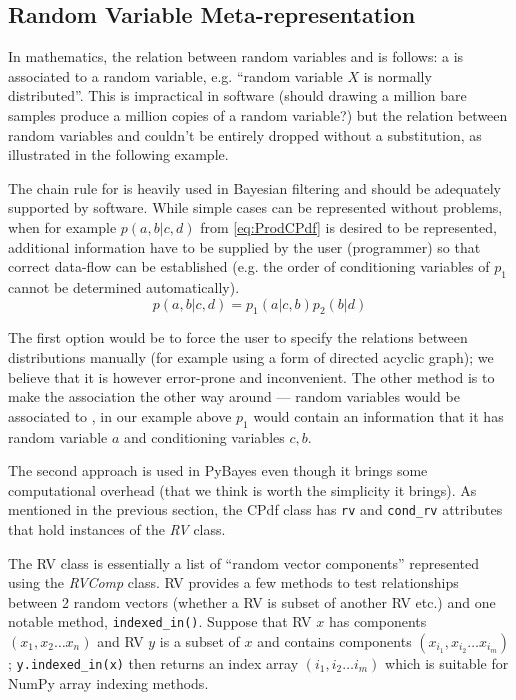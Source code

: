 \subsection{Random Variable Meta-representation}

In mathematics, the relation between random variables and {\pdfs} is follows: a {\pdf} is associated
to a random variable, e.g. ``random variable \(X\) is normally distributed''. This is impractical in
software (should drawing a million bare samples produce a million copies of a random variable?) but
the relation between random variables and {\pdfs} couldn't be entirely dropped without a substitution,
as illustrated in the following example.

The chain rule for {\pdfs} is heavily used in Bayesian filtering and should be adequately supported
by software. While simple cases can be represented without problems, when for example \(p(a,b|c,d)\)
from \eqref{eq:ProdCPdf} is desired to be represented, additional information have to be supplied by
the user (programmer) so that correct data-flow can be established (e.g. the order of conditioning
variables of \(p_1\) cannot be determined automatically).
\begin{equation} \label{eq:ProdCPdf}
	p(a,b|c,d) = p_1(a|c,b) p_2(b|d)
\end{equation}

The first option would be to force the user to specify the relations between distributions manually
(for example using a form of directed acyclic graph); we believe that it is however error-prone
and inconvenient. The other method is to make the association the other way around --- random
variables would be associated to {\pdfs}, in our example above \(p_1\) would contain an information
that it has random variable \(a\) and conditioning variables \(c,b\).

The second approach is used in PyBayes even though it brings some computational overhead (that we
think is worth the simplicity it brings). As mentioned in the previous section, the CPdf class has
\verb|rv| and \verb|cond_rv| attributes that hold instances of the \emph{RV} class.

The RV class is essentially a list of ``random vector components'' represented using the
\emph{RVComp} class. RV provides a few methods to test relationships between 2 random vectors
(whether a RV is subset of another RV etc.) and one notable method, \verb|indexed_in()|. Suppose
that RV \(x\) has components \((x_1, x_2 \dots x_n)\) and RV \(y\) is a subset of \(x\) and contains
components \((x_{i_1}, x_{i_2} \dots x_{i_m})\); \verb|y.indexed_in(x)| then returns an index array
\((i_1, i_2 \dots i_m)\) which is suitable for NumPy array indexing methods.

